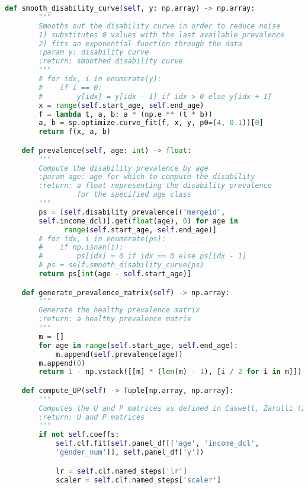 \begin{lstlisting}[language=Python]
    def smooth_disability_curve(self, y: np.array) -> np.array:
        """
        Smooths out the disability curve in order to reduce noise
        1) substitutes 0 values with the last available prevalence
        2) fits an exponential function through the data
        :param y: disability curve
        :return: smoothed disability curve
        """
        # for idx, i in enumerate(y):
        #    if i == 0:
        #        y[idx] = y[idx - 1] if idx > 0 else y[idx + 1]
        x = range(self.start_age, self.end_age)
        f = lambda t, a, b: a * (np.e ** (t * b))
        a, b = sp.optimize.curve_fit(f, x, y, p0=(4, 0.1))[0]
        return f(x, a, b)

    def prevalence(self, age: int) -> float:
        """
        Compute the disability prevalence by age
        :param age: age for which to compute the disability
        :return: a float representing the disability prevalence
                 for the specified age class
        """
        ps = [self.disability_prevalence[('mergeid',
        self.income_dcl)].get(float(age), 0) for age in
              range(self.start_age, self.end_age)]
        # for idx, i in enumerate(ps):
        #    if np.isnan(i):
        #        ps[idx] = 0 if idx == 0 else ps[idx - 1]
        # ps = self.smooth_disability_curve(ps)
        return ps[int(age - self.start_age)]

    def generate_prevalence_matrix(self) -> np.array:
        """
        Generate the healthy prevalence matrix
        :return: a healthy prevalence matrix
        """
        m = []
        for age in range(self.start_age, self.end_age):
            m.append(self.prevalence(age))
        m.append(0)
        return 1 - np.vstack([[m] * (len(m) - 1), [i / 2 for i in m]])

    def compute_UP(self) -> Tuple[np.array, np.array]:
        """
        Computes the U and P matrices as defined in Caswell, Zarulli (2018)
        :return: U and P matrices
        """
        if not self.coeffs:
            self.clf.fit(self.panel_df[['age', 'income_dcl', 
            'gender_num']], self.panel_df['y'])

            lr = self.clf.named_steps['lr']
            scaler = self.clf.named_steps['scaler']


\end{lstlisting}
